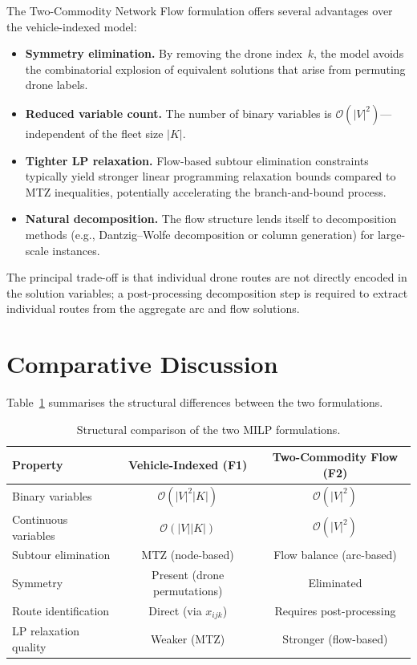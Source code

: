 \documentclass[11pt,a4paper]{article}
\begin{document}
The Two-Commodity Network Flow formulation offers several advantages over the vehicle-indexed model:

\begin{itemize}
  \item \textbf{Symmetry elimination.} By removing the drone index~$k$, the model avoids the combinatorial explosion of equivalent solutions that arise from permuting drone labels.
  \item \textbf{Reduced variable count.} The number of binary variables is $\mathcal{O}(|V|^2)$---independent of the fleet size $|K|$.
  \item \textbf{Tighter LP relaxation.} Flow-based subtour elimination constraints typically yield stronger linear programming relaxation bounds compared to MTZ inequalities, potentially accelerating the branch-and-bound process.
  \item \textbf{Natural decomposition.} The flow structure lends itself to decomposition methods (e.g., Dantzig--Wolfe decomposition or column generation) for large-scale instances.
\end{itemize}

\noindent The principal trade-off is that individual drone routes are not directly encoded in the solution variables; a post-processing decomposition step is required to extract individual routes from the aggregate arc and flow solutions.

\section{Comparative Discussion}

Table~\ref{tab:comparison} summarises the structural differences between the two formulations.

\begin{table}[ht]
\centering
\caption{Structural comparison of the two MILP formulations.}
\label{tab:comparison}
\begin{tabular}{@{}lcc@{}}
\toprule
\textbf{Property} & \textbf{Vehicle-Indexed (F1)} & \textbf{Two-Commodity Flow (F2)} \\
\midrule
Binary variables & $\mathcal{O}(|V|^2 |K|)$ & $\mathcal{O}(|V|^2)$ \\
Continuous variables & $\mathcal{O}(|V| |K|)$ & $\mathcal{O}(|V|^2)$ \\
Subtour elimination & MTZ (node-based) & Flow balance (arc-based) \\
Symmetry & Present (drone permutations) & Eliminated \\
Route identification & Direct (via $x_{ijk}$) & Requires post-processing \\
LP relaxation quality & Weaker (MTZ) & Stronger (flow-based) \\
\bottomrule
\end{tabular}
\end{table}
\end{document}
